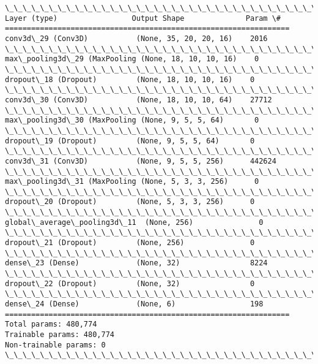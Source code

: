 \documentclass[11pt]{article}
\begin{document}
    \begin{Verbatim}[commandchars=\\\{\}]
\_\_\_\_\_\_\_\_\_\_\_\_\_\_\_\_\_\_\_\_\_\_\_\_\_\_\_\_\_\_\_\_\_\_\_\_\_\_\_\_\_\_\_\_\_\_\_\_\_\_\_\_\_\_\_\_\_\_\_\_\_\_\_\_\_
Layer (type)                 Output Shape              Param \#   
=================================================================
conv3d\_29 (Conv3D)           (None, 35, 20, 20, 16)    2016      
\_\_\_\_\_\_\_\_\_\_\_\_\_\_\_\_\_\_\_\_\_\_\_\_\_\_\_\_\_\_\_\_\_\_\_\_\_\_\_\_\_\_\_\_\_\_\_\_\_\_\_\_\_\_\_\_\_\_\_\_\_\_\_\_\_
max\_pooling3d\_29 (MaxPooling (None, 18, 10, 10, 16)    0         
\_\_\_\_\_\_\_\_\_\_\_\_\_\_\_\_\_\_\_\_\_\_\_\_\_\_\_\_\_\_\_\_\_\_\_\_\_\_\_\_\_\_\_\_\_\_\_\_\_\_\_\_\_\_\_\_\_\_\_\_\_\_\_\_\_
dropout\_18 (Dropout)         (None, 18, 10, 10, 16)    0         
\_\_\_\_\_\_\_\_\_\_\_\_\_\_\_\_\_\_\_\_\_\_\_\_\_\_\_\_\_\_\_\_\_\_\_\_\_\_\_\_\_\_\_\_\_\_\_\_\_\_\_\_\_\_\_\_\_\_\_\_\_\_\_\_\_
conv3d\_30 (Conv3D)           (None, 18, 10, 10, 64)    27712     
\_\_\_\_\_\_\_\_\_\_\_\_\_\_\_\_\_\_\_\_\_\_\_\_\_\_\_\_\_\_\_\_\_\_\_\_\_\_\_\_\_\_\_\_\_\_\_\_\_\_\_\_\_\_\_\_\_\_\_\_\_\_\_\_\_
max\_pooling3d\_30 (MaxPooling (None, 9, 5, 5, 64)       0         
\_\_\_\_\_\_\_\_\_\_\_\_\_\_\_\_\_\_\_\_\_\_\_\_\_\_\_\_\_\_\_\_\_\_\_\_\_\_\_\_\_\_\_\_\_\_\_\_\_\_\_\_\_\_\_\_\_\_\_\_\_\_\_\_\_
dropout\_19 (Dropout)         (None, 9, 5, 5, 64)       0         
\_\_\_\_\_\_\_\_\_\_\_\_\_\_\_\_\_\_\_\_\_\_\_\_\_\_\_\_\_\_\_\_\_\_\_\_\_\_\_\_\_\_\_\_\_\_\_\_\_\_\_\_\_\_\_\_\_\_\_\_\_\_\_\_\_
conv3d\_31 (Conv3D)           (None, 9, 5, 5, 256)      442624    
\_\_\_\_\_\_\_\_\_\_\_\_\_\_\_\_\_\_\_\_\_\_\_\_\_\_\_\_\_\_\_\_\_\_\_\_\_\_\_\_\_\_\_\_\_\_\_\_\_\_\_\_\_\_\_\_\_\_\_\_\_\_\_\_\_
max\_pooling3d\_31 (MaxPooling (None, 5, 3, 3, 256)      0         
\_\_\_\_\_\_\_\_\_\_\_\_\_\_\_\_\_\_\_\_\_\_\_\_\_\_\_\_\_\_\_\_\_\_\_\_\_\_\_\_\_\_\_\_\_\_\_\_\_\_\_\_\_\_\_\_\_\_\_\_\_\_\_\_\_
dropout\_20 (Dropout)         (None, 5, 3, 3, 256)      0         
\_\_\_\_\_\_\_\_\_\_\_\_\_\_\_\_\_\_\_\_\_\_\_\_\_\_\_\_\_\_\_\_\_\_\_\_\_\_\_\_\_\_\_\_\_\_\_\_\_\_\_\_\_\_\_\_\_\_\_\_\_\_\_\_\_
global\_average\_pooling3d\_11  (None, 256)               0         
\_\_\_\_\_\_\_\_\_\_\_\_\_\_\_\_\_\_\_\_\_\_\_\_\_\_\_\_\_\_\_\_\_\_\_\_\_\_\_\_\_\_\_\_\_\_\_\_\_\_\_\_\_\_\_\_\_\_\_\_\_\_\_\_\_
dropout\_21 (Dropout)         (None, 256)               0         
\_\_\_\_\_\_\_\_\_\_\_\_\_\_\_\_\_\_\_\_\_\_\_\_\_\_\_\_\_\_\_\_\_\_\_\_\_\_\_\_\_\_\_\_\_\_\_\_\_\_\_\_\_\_\_\_\_\_\_\_\_\_\_\_\_
dense\_23 (Dense)             (None, 32)                8224      
\_\_\_\_\_\_\_\_\_\_\_\_\_\_\_\_\_\_\_\_\_\_\_\_\_\_\_\_\_\_\_\_\_\_\_\_\_\_\_\_\_\_\_\_\_\_\_\_\_\_\_\_\_\_\_\_\_\_\_\_\_\_\_\_\_
dropout\_22 (Dropout)         (None, 32)                0         
\_\_\_\_\_\_\_\_\_\_\_\_\_\_\_\_\_\_\_\_\_\_\_\_\_\_\_\_\_\_\_\_\_\_\_\_\_\_\_\_\_\_\_\_\_\_\_\_\_\_\_\_\_\_\_\_\_\_\_\_\_\_\_\_\_
dense\_24 (Dense)             (None, 6)                 198       
=================================================================
Total params: 480,774
Trainable params: 480,774
Non-trainable params: 0
\_\_\_\_\_\_\_\_\_\_\_\_\_\_\_\_\_\_\_\_\_\_\_\_\_\_\_\_\_\_\_\_\_\_\_\_\_\_\_\_\_\_\_\_\_\_\_\_\_\_\_\_\_\_\_\_\_\_\_\_\_\_\_\_\_


\end{Verbatim}
\end{document}
